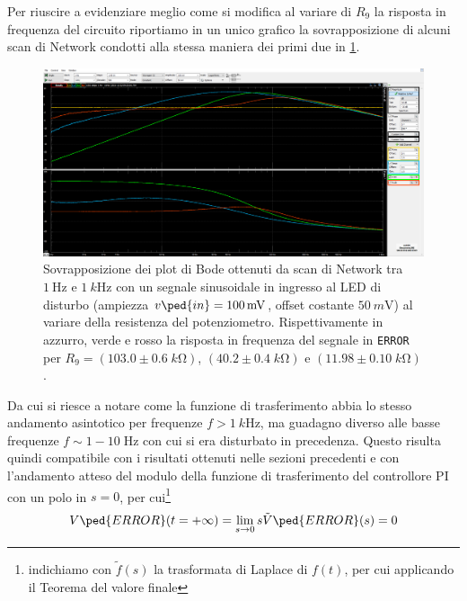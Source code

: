 \documentclass[10pt, a4paper, italian]{article}
\begin{document}
Per riuscire a evidenziare meglio come si modifica al variare di $R_9$ la
risposta in frequenza del circuito riportiamo in un unico grafico la
sovrapposizione di alcuni scan di Network condotti alla stessa maniera dei
primi due in \cref{fig: netR9func}.
\begin{figure}[htbp]
    \centering
	\includegraphics[width=\textwidth]{netR9func}
    \caption{Sovrapposizione dei plot di Bode ottenuti da scan di Network tra
    $\SI{1}{\Hz}$ e $\SI{1}{k\Hz}$ con un segnale sinusoidale in ingresso al
    LED di disturbo (ampiezza $v\ped{in} = \SI{100}{m\V}$, offset costante
    $\SI{50}{m\V}$) al variare della resistenza del potenziometro. 
	Rispettivamente in azzurro, verde e rosso la risposta in frequenza del
	segnale in \texttt{ERROR} per $R_9 = (103.0 \pm 0.6 \; \si{k\ohm})$,
	$(40.2 \pm 0.4 \; \si{k\ohm})$ e $(11.98 \pm 0.10 \; \si{k\ohm})$.
    \label{fig: netR9func}}
\end{figure}

Da cui si riesce a notare come la funzione di trasferimento abbia lo stesso
andamento asintotico per frequenze $f > \SI{1}{k\Hz}$, ma guadagno diverso
alle basse frequenze $f \sim 1 - 10 \; \si{\Hz}$ con cui si era disturbato in
precedenza. Questo risulta quindi compatibile con i risultati ottenuti nelle
sezioni precedenti e con l'andamento atteso del modulo della funzione di
trasferimento del controllore PI con un polo in $s = 0$, per cui\footnote{
indichiamo con $\tilde{f} (s)$ la trasformata di Laplace di $f(t)$, per cui
applicando il Teorema del valore finale}
\begin{equation}
V\ped{ERROR} (t = +\infty) = \lim_{s \to 0} s \tilde{V}\ped{ERROR}(s) = 0
\end{equation}

\end{document}
